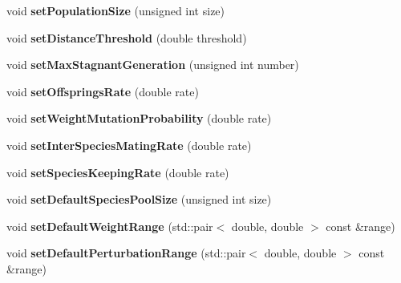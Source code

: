\begin{DoxyCompactItemize}
void {\bfseries set\+Population\+Size} (unsigned int size)
\item 
\mbox{\label{class_indie_neat_1_1_neat_engine_a7f50069ece57d11e8f3f281c3f455c0e}} 
void {\bfseries set\+Distance\+Threshold} (double threshold)
\item 
\mbox{\label{class_indie_neat_1_1_neat_engine_aa6432f4ed608efa054fdb7294a6d2854}} 
void {\bfseries set\+Max\+Stagnant\+Generation} (unsigned int number)
\item 
\mbox{\label{class_indie_neat_1_1_neat_engine_aff67e5c00a7bbe4bb7eeeb1e99dd4115}} 
void {\bfseries set\+Offsprings\+Rate} (double rate)
\item 
\mbox{\label{class_indie_neat_1_1_neat_engine_a02be0b783551b649882aff2ffa5823fb}} 
void {\bfseries set\+Weight\+Mutation\+Probability} (double rate)
\item 
\mbox{\label{class_indie_neat_1_1_neat_engine_a68f7f595180a3d663263209fd80123e1}} 
void {\bfseries set\+Inter\+Species\+Mating\+Rate} (double rate)
\item 
\mbox{\label{class_indie_neat_1_1_neat_engine_ade9503fe02b49925dd50ecb1c3acec3e}} 
void {\bfseries set\+Species\+Keeping\+Rate} (double rate)
\item 
\mbox{\label{class_indie_neat_1_1_neat_engine_a60dda8952c92be48a6c8e3f3ec6648d1}} 
void {\bfseries set\+Default\+Species\+Pool\+Size} (unsigned int size)
\item 
\mbox{\label{class_indie_neat_1_1_neat_engine_a7236c7c66a428cf33a2e63a79b843b64}} 
void {\bfseries set\+Default\+Weight\+Range} (std\+::pair$<$ double, double $>$ const \&range)
\item 
\mbox{\label{class_indie_neat_1_1_neat_engine_a4bab2c61316334e721f216a9d45608a2}} 
void {\bfseries set\+Default\+Perturbation\+Range} (std\+::pair$<$ double, double $>$ const \&range)
\item 

\end{DoxyCompactItemize}
